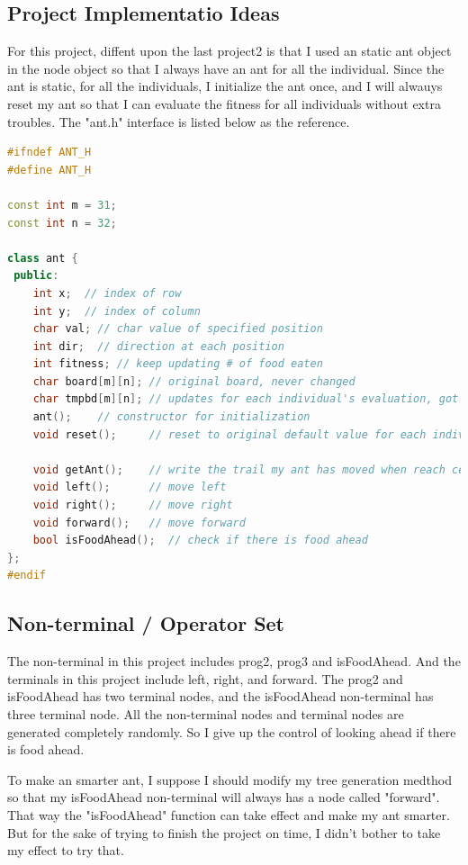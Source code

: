\documentclass[10pt,b5paper]{article}
\begin{document}
\subsection{Project Implementatio Ideas}
\label{sec-1-1}
For this project, diffent upon the last project2 is that I used an static ant object in the node object so that I always have an ant for all the individual. Since the ant is static, for all the individuals, I initialize the ant once, and I will alwauys reset my ant so that I can evaluate the fitness for all individuals without extra troubles. 
The "ant.h" interface is listed below as the reference. 
\begin{lstlisting}[language=c++]
#ifndef ANT_H
#define ANT_H

const int m = 31;
const int n = 32;

class ant {
 public:
    int x;  // index of row
    int y;  // index of column
    char val; // char value of specified position
    int dir;  // direction at each position
    int fitness; // keep updating # of food eaten
    char board[m][n]; // original board, never changed
    char tmpbd[m][n]; // updates for each individual's evaluation, got reset for every individual
    ant();    // constructor for initialization
    void reset();     // reset to original default value for each individual

    void getAnt();    // write the trail my ant has moved when reach certain fitness
    void left();      // move left
    void right();     // move right
    void forward();   // move forward
    bool isFoodAhead();  // check if there is food ahead
};
#endif
\end{lstlisting}
\subsection{Non-terminal / Operator Set}
\label{sec-1-2}
The non-terminal in this project includes prog2, prog3 and isFoodAhead.
And the terminals in this project include left, right, and forward.
The prog2 and isFoodAhead has two terminal nodes, and the isFoodAhead non-terminal has three terminal node. All the non-terminal nodes and terminal nodes are generated completely randomly. So I give up the control of looking ahead if there is food ahead. 

To make an smarter ant, I suppose I should modify my tree generation medthod so that my isFoodAhead non-terminal will always has a node called "forward". That way the "isFoodAhead" function can take effect and make my ant smarter. But for the sake of trying to finish the project on time, I didn't bother to take my effect to try that. 
\end{document}
